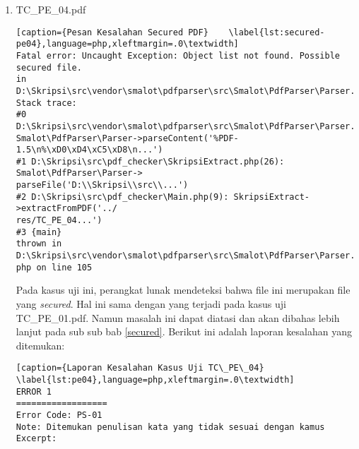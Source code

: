 \begin{enumerate}
\begin{lstlisting}[caption={Laporan Kesalahan Kasus Uji TC\_PE\_03}	\label{lst:pe03},language=php,xleftmargin=.0\textwidth]
ERROR 10
==================
Error Code: KAL-02
Note: Berilah kata pengantar untuk setiap bab
Excerpt: BAB 1 PENDAHULUAN 1.1Latar BelakangSnake merupakan sebuah permainan 
yang pertama kali dibuat oleh Peter Trefonas pada tahun 1978
\end{lstlisting}	
	
	\item TC\_PE\_04.pdf

\begin{lstlisting}[caption={Pesan Kesalahan Secured PDF}	\label{lst:secured-pe04},language=php,xleftmargin=.0\textwidth]
Fatal error: Uncaught Exception: Object list not found. Possible secured file. 
in D:\Skripsi\src\vendor\smalot\pdfparser\src\Smalot\PdfParser\Parser.php:105
Stack trace:
#0 D:\Skripsi\src\vendor\smalot\pdfparser\src\Smalot\PdfParser\Parser.php(81): 
Smalot\PdfParser\Parser->parseContent('%PDF-1.5\n%\xD0\xD4\xC5\xD8\n...')
#1 D:\Skripsi\src\pdf_checker\SkripsiExtract.php(26): Smalot\PdfParser\Parser->
parseFile('D:\\Skripsi\\src\\...')
#2 D:\Skripsi\src\pdf_checker\Main.php(9): SkripsiExtract->extractFromPDF('../
res/TC_PE_04...')
#3 {main}
thrown in D:\Skripsi\src\vendor\smalot\pdfparser\src\Smalot\PdfParser\Parser.
php on line 105
\end{lstlisting}

	Pada kasus uji ini, perangkat lunak mendeteksi bahwa file ini merupakan file yang \textit{secured}. Hal ini sama dengan yang terjadi pada kasus uji TC\_PE\_01.pdf. Namun masalah ini dapat diatasi dan akan dibahas lebih lanjut pada sub sub bab \ref{secured}. Berikut ini adalah laporan kesalahan yang ditemukan:

\begin{lstlisting}[caption={Laporan Kesalahan Kasus Uji TC\_PE\_04}	\label{lst:pe04},language=php,xleftmargin=.0\textwidth]
ERROR 1
==================
Error Code: PS-01
Note: Ditemukan penulisan kata yang tidak sesuai dengan kamus
Excerpt:


\end{lstlisting}
\end{enumerate}
